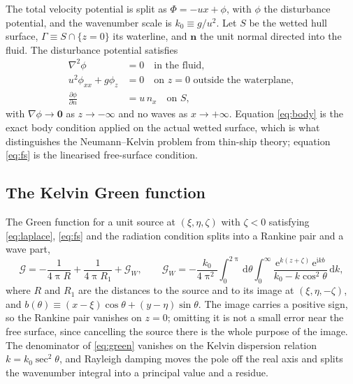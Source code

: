 \documentclass[11pt]{article}
\begin{document}
The total velocity potential is split as $\Phi = -ux + \phi$, with $\phi$ the disturbance
potential, and the wavenumber scale is $k_0 \equiv g/u^2$. Let $S$ be the wetted hull
surface, $\Gamma \equiv S \cap \{z=0\}$ its waterline, and $\bm{n}$ the unit normal
directed into the fluid. The disturbance potential satisfies
\begin{align}
\nabla^2\phi &= 0 \quad \text{in the fluid},\label{eq:laplace}\\
u^2\phi_{xx} + g\phi_z &= 0 \quad \text{on } z=0 \text{ outside the waterplane},
\label{eq:fs}\\
\frac{\partial\phi}{\partial n} &= u\,n_x \quad \text{on } S,\label{eq:body}
\end{align}
with $\nabla\phi\to\bm{0}$ as $z\to-\infty$ and no waves as $x\to+\infty$. Equation
\eqref{eq:body} is the exact body condition applied on the actual wetted surface, which is
what distinguishes the Neumann--Kelvin problem from thin-ship theory; equation \eqref{eq:fs}
is the linearised free-surface condition.

\subsection{The Kelvin Green function}

The Green function for a unit source at $(\xi,\eta,\zeta)$ with $\zeta<0$ satisfying
\eqref{eq:laplace}, \eqref{eq:fs} and the radiation condition splits into a Rankine pair
and a wave part,
\begin{equation}
\mathcal{G} = -\frac{1}{4\uppi R} + \frac{1}{4\uppi R_1} + \mathcal{G}_W ,
\qquad
\mathcal{G}_W = -\frac{k_0}{4\uppi^2}\int_0^{2\uppi}\!\!\mathrm{d}\theta
\int_0^\infty \frac{\mathrm{e}^{k(z+\zeta)}\,\mathrm{e}^{\mathrm{i}kb}}
{k_0 - k\cos^2\theta}\,\mathrm{d}k ,
\label{eq:green}
\end{equation}
where $R$ and $R_1$ are the distances to the source and to its image at
$(\xi,\eta,-\zeta)$, and $b(\theta) \equiv (x-\xi)\cos\theta + (y-\eta)\sin\theta$. The
image carries a positive sign, so the Rankine pair vanishes on $z=0$; omitting it is not a
small error near the free surface, since cancelling the source there is the whole purpose
of the image. The denominator of \eqref{eq:green} vanishes on the Kelvin dispersion
relation $k = k_0\sec^2\theta$, and Rayleigh damping moves the pole off the real axis and
splits the wavenumber integral into a principal value and a residue.
\end{document}
